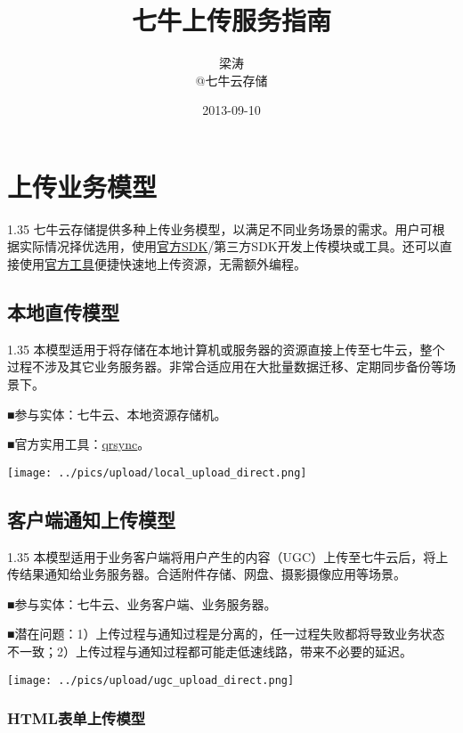 \documentclass[11pt, oneside]{book}
\title{七牛上传服务指南}
\author{梁涛 \\ @七牛云存储}
\date{2013-09-10}
\newcommand{\qpara}[1]{
\vspace{0.2em}
\begin{spacing}{1.35}
\noindent
#1\par
\end{spacing}
\vspace{0.2em}
}
\newcommand{\qblock}[1]{
\vspace{0.1em}
\noindent
#1\par
\vspace{0.1em}
}
\begin{document}
\maketitle
\tableofcontents

\chapter{上传业务模型}

\qpara{七牛云存储提供多种上传业务模型，以满足不同业务场景的需求。用户可根据实际情况择优选用，使用\href{http://docs.qiniu.com/sdk/index.html}{官方SDK}/第三方SDK开发上传模块或工具。还可以直接使用\href{http://docs.qiniu.com/tools/v6/index.html}{官方工具}便捷快速地上传资源，无需额外编程。}

\section{本地直传模型}

\qpara{本模型适用于将存储在本地计算机或服务器的资源直接上传至七牛云，整个过程不涉及其它业务服务器。非常合适应用在大批量数据迁移、定期同步备份等场景下。}
\qblock{■\thinspace 参与实体：七牛云、本地资源存储机。}
\qblock{■\thinspace 官方实用工具：\href{http://docs.qiniu.com/tools/v6/qrsync.html}{qrsync}。}

\begin{center}
\texttt{[image: ../pics/upload/local\_upload\_direct.png]}
\end{center}

\clearpage

\section{客户端通知上传模型}

\qpara{本模型适用于业务客户端将用户产生的内容（UGC）上传至七牛云后，将上传结果通知给业务服务器。合适附件存储、网盘、摄影摄像应用等场景。}
\qblock{■\thinspace 参与实体：七牛云、业务客户端、业务服务器。}
\qblock{■\thinspace 潜在问题：1）上传过程与通知过程是分离的，任一过程失败都将导致业务状态不一致；2）上传过程与通知过程都可能走低速线路，带来不必要的延迟。}

\begin{center}
\texttt{[image: ../pics/upload/ugc\_upload\_direct.png]}
\end{center}

\clearpage

\subsection{HTML表单上传模型}
\end{document}

